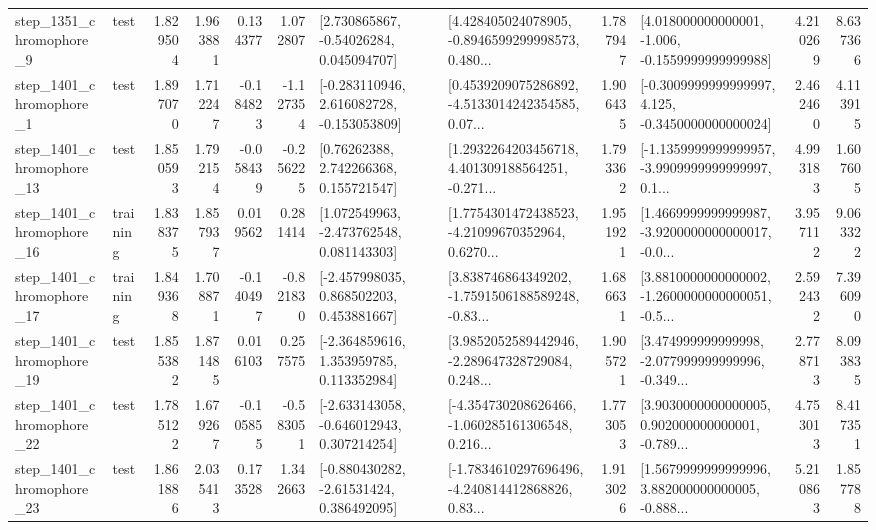 \begin{tabular}{llrrrrllrlrr}
  step\_1351\_chromophore\_9 &      test &      1.829504 &    1.963881 &      0.134377 &  1.072807 &     [2.730865867, -0.54026284, 0.045094707] &  [4.428405024078905, -0.8946599299998573, 0.480... &       1.787947 &   [4.018000000000001, -1.006, -0.1559999999999988] &            4.210269 &          8.637366 \\
  step\_1401\_chromophore\_1 &      test &      1.897070 &    1.712247 &     -0.184823 & -1.127354 &   [-0.283110946, 2.616082728, -0.153053809] &  [0.4539209075286892, -4.5133014242354585, 0.07... &       1.906435 &  [-0.3009999999999997, 4.125, -0.3450000000000024] &            2.462460 &          4.113915 \\
 step\_1401\_chromophore\_13 &      test &      1.850593 &    1.792154 &     -0.058439 & -0.256225 &      [0.76262388, 2.742266368, 0.155721547] &  [1.2932264203456718, 4.401309188564251, -0.271... &       1.793362 &  [-1.1359999999999957, -3.9909999999999997, 0.1... &            4.993183 &          1.607605 \\
 step\_1401\_chromophore\_16 &  training &      1.838375 &    1.857937 &      0.019562 &  0.281414 &    [1.072549963, -2.473762548, 0.081143303] &  [1.7754301472438523, -4.21099670352964, 0.6270... &       1.951921 &  [1.4669999999999987, -3.9200000000000017, -0.0... &            3.957112 &          9.063322 \\
 step\_1401\_chromophore\_17 &  training &      1.849368 &    1.708871 &     -0.140497 & -0.821830 &    [-2.457998035, 0.868502203, 0.453881667] &  [3.838746864349202, -1.7591506188589248, -0.83... &       1.686631 &  [3.8810000000000002, -1.2600000000000051, -0.5... &            2.592432 &          7.396090 \\
 step\_1401\_chromophore\_19 &      test &      1.855382 &    1.871485 &      0.016103 &  0.257575 &    [-2.364859616, 1.353959785, 0.113352984] &  [3.9852052589442946, -2.289647328729084, 0.248... &       1.905721 &  [3.474999999999998, -2.077999999999996, -0.349... &            2.778713 &          8.093835 \\
 step\_1401\_chromophore\_22 &      test &      1.785122 &    1.679267 &     -0.105855 & -0.583051 &   [-2.633143058, -0.646012943, 0.307214254] &  [-4.354730208626466, -1.060285161306548, 0.216... &       1.773053 &  [3.9030000000000005, 0.902000000000001, -0.789... &            4.753013 &          8.417351 \\
 step\_1401\_chromophore\_23 &      test &      1.861886 &    2.035413 &      0.173528 &  1.342663 &    [-0.880430282, -2.61531424, 0.386492095] &  [-1.7834610297696496, -4.240814412868826, 0.83... &       1.913026 &  [1.5679999999999996, 3.882000000000005, -0.888... &            5.210863 &          1.857788 \\

\end{tabular}
